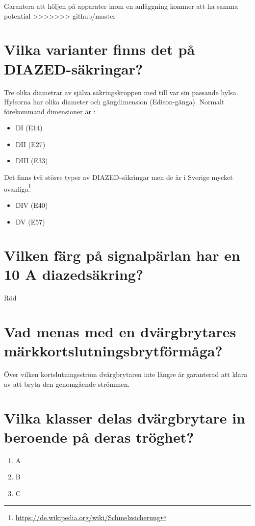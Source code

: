 \documentclass[a4paper,swedish]{article}
\begin{document}
Garantera att höljen på apparater inom en anläggning kommer att ha samma potential
>>>>>>> github/master

\setcounter{section}{7}
\section{Vilka varianter finns det på DIAZED-säkringar?}\label{sec:diazedvarianter}

Tre olika diametrar av själva säkringskroppen med till var sin passande hylsa.
Hylsorna har olika diameter och gängdimension (Edison-gänga). Normalt förekommand dimensioner är :
\begin{itemize}
\item  DI (E14)
\item DII (E27)
\item DIII (E33)
\end{itemize}

Det finns två större typer av DIAZED-säkringar men de är i Sverige mycket ovanliga\footnote{\url{https://de.wikipedia.org/wiki/Schmelzsicherung}}
\begin{itemize}
\item DIV (E40)
\item DV (E57)
\end{itemize}

\setcounter{section}{9}
\section{Vilken färg på signalpärlan har en 10 A diazedsäkring?}\label{sec:diazed_10A}

Röd

\setcounter{section}{11}
\section{Vad menas med en dvärgbrytares märkkortslutningsbrytförmåga?}\label{sec:RCD_short_interrupt}

Över vilken kortslutningsström dvärgbrytaren inte längre är garanterad att klara av att bryta
den genomgående strömmen.

\setcounter{section}{13}
\section{Vilka klasser delas dvärgbrytare in beroende på deras tröghet?}\label{sec:RCD_classes}

\begin{enumerate}
\item A
\item B
\item C
\end{enumerate}
\end{document}

